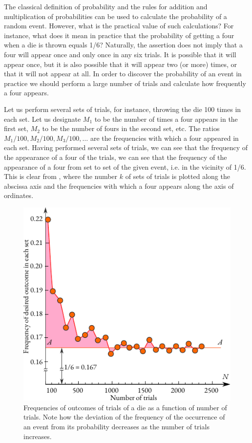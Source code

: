  The classical
definition of probability and the rules for addition and
multiplication of probabilities can be used to calculate the
probability of a random event. However, what is the practical value of
such calculations? For instance, what does it mean in practice that
the probability of getting a four when a die is thrown equals 1/6? Naturally, the assertion does not imply that a four will appear once and only once in any six trials. It is possible that it will appear once, but it is also possible that it will appear two (or more) times, or that it will not appear at all. In order to discover the probability of an event in practice we should perform a large number of trials and calculate how frequently a four appears.


Let us perform several sets of trials, for instance, throwing the die
100 times in each set. Let us designate $M_{1}$ to be the number of
times a four appears in the first set, $M_{2}$ to be the
number of fours in the second set, etc. The ratios
$M_{1}/100, M_{2}/100, M_{3}/100, \ldots{} $ are the frequencies with
which a four appeared in each set. Having performed several sets of
trials, we can see that the frequency of the appearance of a four
 of the trials, we can see that the frequency of the
appearance of a four  from set to set  of the given event,
i.e. in the vicinity of 1/6. This is clear from , where the number $k$ of sets of trials is plotted along the abscissa axis and the frequencies with which a four appears along
the axis of ordinates. 

\begin{figure}%
 \centering
 \includegraphics[width=0.9\tfwidth]{figures/die-graph2.pdf}
\caption{Frequencies of outcomes of trials of a die as a function of number of trials. Note how the deviation of the frequency of the occurrence of an event from its probability decreases as the number of trials increases.\label{die-graph2}}
 \end{figure}
 
